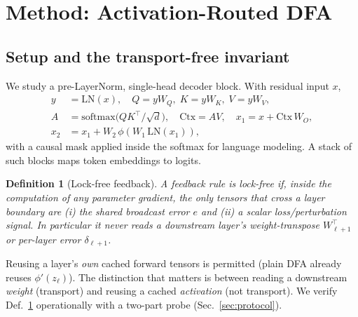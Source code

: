 \documentclass[11pt]{article}
\newtheorem{definition}{Definition}
\begin{document}
\section{Method: Activation-Routed DFA}\label{sec:method}
\subsection{Setup and the transport-free invariant}
We study a pre-LayerNorm, single-head decoder block. With residual input $x$,
\begin{align}
y &= \mathrm{LN}(x), \quad Q=yW_Q,\; K=yW_K,\; V=yW_V, \label{eq:qkv}\\
A &= \mathrm{softmax}\!\big(QK^\top/\sqrt{d}\big),\quad \mathrm{Ctx}=AV,\quad x_1 = x + \mathrm{Ctx}\,W_O, \label{eq:attn}\\
x_2 &= x_1 + W_2\,\phi(W_1\,\mathrm{LN}(x_1)), \label{eq:mlp}
\end{align}
with a causal mask applied inside the softmax for language modeling. A stack of such blocks maps token embeddings to logits.

\begin{definition}[Lock-free feedback]\label{def:lockfree}
A feedback rule is \emph{lock-free} if, inside the computation of any parameter gradient, the only tensors that cross a layer boundary are (i) the shared broadcast error $e$ and (ii) a scalar loss/perturbation signal. In particular it never reads a downstream layer's weight-transpose $W_{\ell+1}^\top$ or per-layer error $\delta_{\ell+1}$.
\end{definition}
Reusing a layer's \emph{own} cached forward tensors is permitted (plain DFA already reuses $\phi'(z_\ell)$). The distinction that matters is between reading a downstream \emph{weight} (transport) and reusing a cached \emph{activation} (not transport). We verify Def.~\ref{def:lockfree} operationally with a two-part probe (Sec.~\ref{sec:protocol}).
\end{document}
